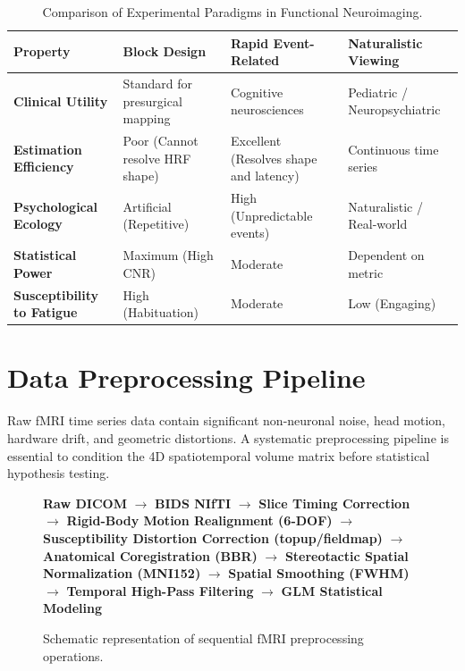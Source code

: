 \documentclass[11pt,a4paper]{article}
\begin{document}
\begin{table}[htbp]
\centering
\small
\caption{Comparison of Experimental Paradigms in Functional Neuroimaging.}
\label{tab:paradigms}
\begin{tabular}{p{3.2cm} p{3.6cm} p{3.6cm} p{3.6cm}}
\toprule
\textbf{Property} & \textbf{Block Design} & \textbf{Rapid Event-Related} & \textbf{Naturalistic Viewing} \\
\midrule
\textbf{Clinical Utility} & Standard for presurgical mapping & Cognitive neurosciences & Pediatric / Neuropsychiatric \\
\textbf{Estimation Efficiency} & Poor (Cannot resolve HRF shape) & Excellent (Resolves shape and latency) & Continuous time series \\
\textbf{Psychological Ecology} & Artificial (Repetitive) & High (Unpredictable events) & Naturalistic / Real-world \\
\textbf{Statistical Power} & Maximum (High CNR) & Moderate & Dependent on metric \\
\textbf{Susceptibility to Fatigue} & High (Habituation) & Moderate & Low (Engaging) \\
\bottomrule
\end{tabular}
\end{table}

\section{Data Preprocessing Pipeline}
Raw fMRI time series data contain significant non-neuronal noise, head motion, hardware drift, and geometric distortions. A systematic preprocessing pipeline is essential to condition the 4D spatiotemporal volume matrix before statistical hypothesis testing.

\begin{figure}[htbp]
\centering
\begin{tcolorbox}[colback=purple!5!white,colframe=purple!60!black,title=\textbf{Standard fMRI Preprocessing Pipeline Sequence},width=\linewidth]
\small
\textbf{Raw DICOM} $\longrightarrow$ \textbf{BIDS NIfTI} $\longrightarrow$ \textbf{Slice Timing Correction} $\longrightarrow$ \textbf{Rigid-Body Motion Realignment (6-DOF)} $\longrightarrow$ \textbf{Susceptibility Distortion Correction (topup/fieldmap)} $\longrightarrow$ \textbf{Anatomical Coregistration (BBR)} $\longrightarrow$ \textbf{Stereotactic Spatial Normalization (MNI152)} $\longrightarrow$ \textbf{Spatial Smoothing (FWHM)} $\longrightarrow$ \textbf{Temporal High-Pass Filtering} $\longrightarrow$ \textbf{GLM Statistical Modeling}
\end{tcolorbox}
\caption{Schematic representation of sequential fMRI preprocessing operations.}
\label{fig:preprocessing_flow}
\end{figure}
\end{document}
